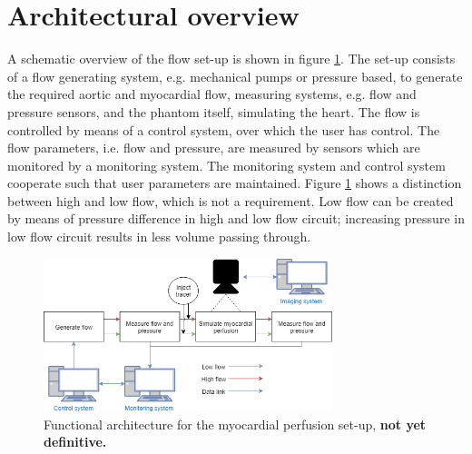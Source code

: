 \section{Architectural overview}
A schematic overview of the flow set-up is shown in figure \ref{fig:funcarch}. The set-up consists of a flow generating system, e.g. mechanical pumps or pressure based, to generate the required aortic and myocardial flow, measuring systems, e.g. flow and pressure sensors, and the phantom itself, simulating the heart. The flow is controlled by means of a control system, over which the user has control. The flow parameters, i.e. flow and pressure, are measured by sensors which are monitored by a monitoring system. The monitoring system and control system cooperate such that user parameters are maintained. Figure \ref{fig:funcarch} shows a distinction between high and low flow, which is not a requirement. Low flow can be created by means of pressure difference in high and low flow circuit; increasing pressure in low flow circuit results in less volume passing through.
\begin{figure}
	\includegraphics[width=0.75\textwidth]{./images/functional_architecture.png}
	\caption{Functional architecture for the myocardial perfusion set-up, \textbf{not yet definitive.}}
	\label{fig:funcarch}
\end{figure}
